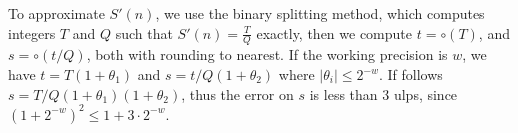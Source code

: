 \documentclass[12pt]{amsart}
\def\q{\hspace*{5mm}}
\def\ulp{{\rm ulp}}
\begin{document}
To approximate $S'(n)$, we use the binary splitting method,
which computes
integers $T$ and $Q$ such that $S'(n) = \frac{T}{Q}$ exactly, then we
compute $t = \circ(T)$, and $s = \circ(t/Q)$, both with rounding to nearest.
If the working precision is $w$,
we have $t = T (1+\theta_1)$ and $s = t/Q(1+\theta_2)$ where
$|\theta_i| \leq 2^{-w}$.
If follows $s = T/Q (1+\theta_1)(1+\theta_2)$, thus the error on $s$
is less than $3$ ulps, since $(1+2^{-w})^2 \leq 1 + 3 \cdot 2^{-w}$.

\medskip
\end{document}
